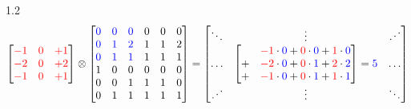 \documentclass{standalone}
\begin{document}
\begin{varwidth}{1.2\linewidth}
    \begin{equation*}
\begin{bmatrix}
  \mathcolor{red}{
  -1 & 0 & +1 \\
  -2 & 0 & +2 \\
  -1 & 0 & +1
  }
\end{bmatrix}
\otimes
\begin{bmatrix}
  
    \mathcolor{blue}{0 & 0 & 0} & 0 & 0 & 0 \\
    \mathcolor{blue}{0 & 1 & 2} & 1 & 1 & 2 \\
    \mathcolor{blue}{0 & 1 & 1} & 1 & 1 & 1 \\
    1 & 0 & 0 & 0 & 0 & 0 \\
    0 & 0 & 1 & 1 & 1 & 0 \\
    0 & 1 & 1 & 1 & 1 & 1
\end{bmatrix}
=
\begin{bmatrix}
    \ddots & \vdots & \iddots \\
    \hdots & \begin{bmatrix}
       &\mathcolor{red}{-1} \cdot \mathcolor{blue}{0} + \mathcolor{red}{0} \cdot \mathcolor{blue}{0} + \mathcolor{red}{1} \cdot \mathcolor{blue}{0}\\
      +&\mathcolor{red}{-2} \cdot \mathcolor{blue}{0} + \mathcolor{red}{0} \cdot \mathcolor{blue}{1} + \mathcolor{red}{2} \cdot \mathcolor{blue}{2}\\
      +&\mathcolor{red}{-1} \cdot \mathcolor{blue}{0} + \mathcolor{red}{0} \cdot \mathcolor{blue}{1} + \mathcolor{red}{1} \cdot \mathcolor{blue}{1}\\
    \end{bmatrix} = \mathcolor{blue}{5} & \hdots  \\
    \iddots & \vdots & \ddots
\end{bmatrix}
\end{equation*}
\end{varwidth}
\end{document}
